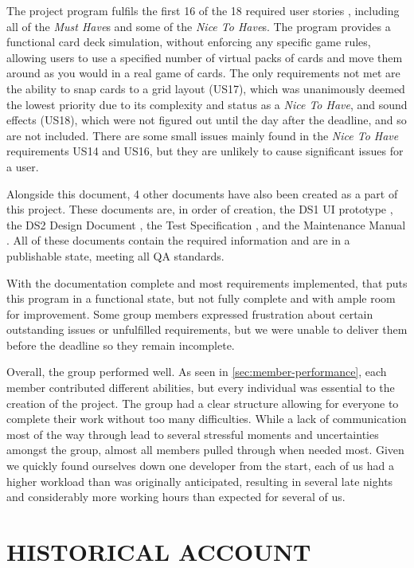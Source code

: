 \documentclass[a4paper]{project}
\begin{document}
		The project program fulfils the first 16 of the 18 required user stories \cite{Product Backlog}, including all of the \emph{Must Have}s and some of the \emph{Nice To Have}s. The program provides a functional card deck simulation, without enforcing any specific game rules, allowing users to use a specified number of virtual packs of cards and move them around as you would in a real game of cards. The only requirements not met are the ability to snap cards to a grid layout (US17), which was unanimously deemed the lowest priority due to its complexity and status as a \emph{Nice To Have}, and sound effects (US18), which were not figured out until the day after the deadline, and so are not included. There are some small issues mainly found in the \emph{Nice To Have} requirements US14 and US16, but they are unlikely to cause significant issues for a user.
		
		Alongside this document, 4 other documents have also been created as a part of this project. These documents are, in order of creation, the DS1 UI prototype \cite{DS1}, the DS2 Design Document \cite{DS2}, the Test Specification \cite{Test Specification}, and the Maintenance Manual \cite{Maintenance Manual}. All of these documents contain the required information and are in a publishable state, meeting all QA standards.
		
		With the documentation complete and most requirements implemented, that puts this program in a functional state, but not fully complete and with ample room for improvement. Some group members expressed frustration about certain outstanding issues or unfulfilled requirements, but we were unable to deliver them before the deadline so they remain incomplete.
		
		Overall, the group performed well. As seen in \vref{sec:member-performance}, each member contributed different abilities, but every individual was essential to the creation of the project. The group had a clear structure allowing for everyone to complete their work without too many difficulties. While a lack of communication most of the way through lead to several stressful moments and uncertainties amongst the group, almost all members pulled through when needed most. Given we quickly found ourselves down one developer from the start, each of us had a higher workload than was originally anticipated, resulting in several late nights and considerably more working hours than expected for several of us.
	
	\section{HISTORICAL ACCOUNT}\label{sec:historical-account}
	
\end{document}
